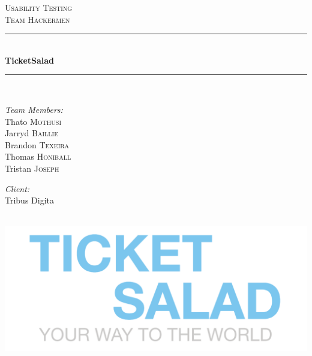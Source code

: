 \documentclass[11pt]{article}
\begin{document}
	\begin{titlepage}
		
		\newcommand{\HRule}{\rule{\linewidth}{0.5mm}} 
		
		\center 
		
		\textsc{\LARGE Usability Testing}\\[0.5cm] 
		\textsc{\Large Team Hackermen}\\[0.5cm] 
		
		\HRule \\[0.4cm]
		{ \huge \bfseries TicketSalad}\\[0.4cm] 
		\HRule \\[1.5cm]
		
		\begin{minipage}{0.4\textwidth}
			\begin{flushleft} \large
				\emph{Team Members:}\\
				Thato \textsc{Mothusi}\\
				Jarryd \textsc{Baillie}\\
				Brandon \textsc{Texeira}\\
				Thomas \textsc{Honiball}\\
				Tristan \textsc{Joseph}\\
			\end{flushleft}
		\end{minipage}
		
		\begin{minipage}{0.4\textwidth}
			\begin{flushright} \large
				\emph{Client:} \\
				Tribus Digita 
			\end{flushright}
		\end{minipage}\\[2cm]
		
		\includegraphics{logo.png}\\[1cm] 
		
	\end{titlepage}
	\newpage
	\tableofcontents
	\newpage
\end{document}
